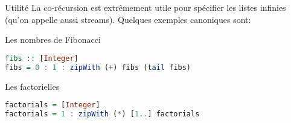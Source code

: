 \documentclass[handout]{beamer}
\begin{document}
  \begin{frame}[fragile]{Utilité}
   La co-récursion est extrêmement utile pour spécifier les listes infinies
   (qu'on appelle aussi streams). Quelques exemples canoniques sont:
   
   \begin{block}{Les nombres de Fibonacci}
     \begin{lstlisting}[language=Haskell]
fibs :: [Integer]
fibs = 0 : 1 : zipWith (+) fibs (tail fibs)
     \end{lstlisting}
   \end{block}
   \pause
   \begin{block}{Les factorielles}
     \begin{lstlisting}[language=Haskell]
factorials = [Integer]
factorials = 1 : zipWith (*) [1..] factorials
     \end{lstlisting}
   \end{block}
\end{frame}
\end{document}
